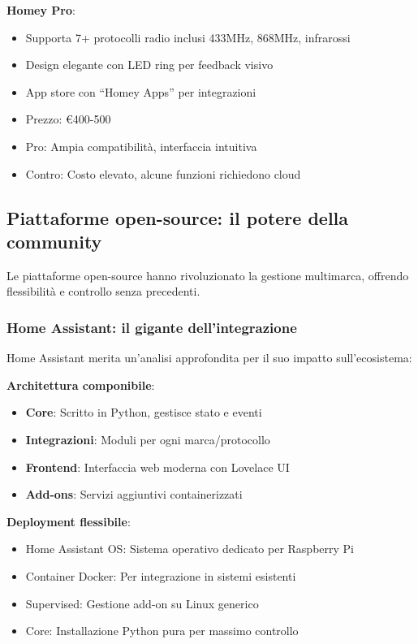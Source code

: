 \textbf{Homey Pro}:
\begin{itemize}
    \item Supporta 7+ protocolli radio inclusi 433MHz, 868MHz, infrarossi
    \item Design elegante con LED ring per feedback visivo
    \item App store con ``Homey Apps'' per integrazioni
    \item Prezzo: €400-500
    \item Pro: Ampia compatibilità, interfaccia intuitiva
    \item Contro: Costo elevato, alcune funzioni richiedono cloud
\end{itemize}

\subsection{Piattaforme open-source: il potere della community}

Le piattaforme open-source hanno rivoluzionato la gestione multimarca, offrendo flessibilità e controllo senza precedenti.

\subsubsection{Home Assistant: il gigante dell'integrazione}

Home Assistant merita un'analisi approfondita per il suo impatto sull'ecosistema:

\textbf{Architettura componibile}:
\begin{itemize}
    \item \textbf{Core}: Scritto in Python, gestisce stato e eventi
    \item \textbf{Integrazioni}: Moduli per ogni marca/protocollo
    \item \textbf{Frontend}: Interfaccia web moderna con Lovelace UI
    \item \textbf{Add-ons}: Servizi aggiuntivi containerizzati
\end{itemize}

\textbf{Deployment flessibile}:
\begin{itemize}
    \item Home Assistant OS: Sistema operativo dedicato per Raspberry Pi
    \item Container Docker: Per integrazione in sistemi esistenti
    \item Supervised: Gestione add-on su Linux generico
    \item Core: Installazione Python pura per massimo controllo
\end{itemize}

